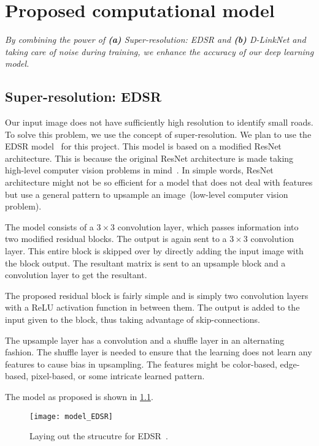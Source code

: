 \chapter{Proposed computational model}\label{chapt:model}
\textit{By combining the power of \textbf{(a)} Super-resolution: EDSR and \textbf{(b)} D-LinkNet and taking care of noise during training, we enhance the accuracy of our deep learning model.}

\section{Super-resolution: EDSR}
Our input image does not have sufficiently high resolution to identify small roads. To solve this problem, we use the concept of super-resolution. We plan to use the EDSR model~\cite{EDSR} for this project. This model is based on a modified ResNet architecture. This is because the original ResNet architecture is made taking high-level computer vision problems in mind~\cite{khan2019surveyResNet}. In simple words, ResNet architecture might not be so efficient for a model that does not deal with features but use a general pattern to upsample an image~(low-level computer vision problem). 

The model consists of a $3\times3$ convolution layer, which passes information into two modified residual blocks. The output is again sent to a $3\times3$ convolution layer. This entire block is skipped over by directly adding the input image with the block output. The resultant matrix is sent to an upsample block and a convolution layer to get the resultant.

The proposed residual block is fairly simple and is simply two convolution layers with a ReLU activation function in between them. The output is added to the input given to the block, thus taking advantage of skip-connections.

The upsample layer has a convolution and a shuffle layer in an alternating fashion. The shuffle layer is needed to ensure that the learning does not learn any features to cause bias in upsampling. The features might be color-based, edge-based, pixel-based, or some intricate learned pattern.

The model as proposed is shown in \cref{fig:model_EDSR}.

\begin{figure}[h!]
  \centering
  \texttt{[image: model\_EDSR]}
  \caption[Laying out the strucutre for EDSR]{Laying out the strucutre for EDSR~\cite{EDSR}.}
  \label{fig:model_EDSR}
\end{figure}


